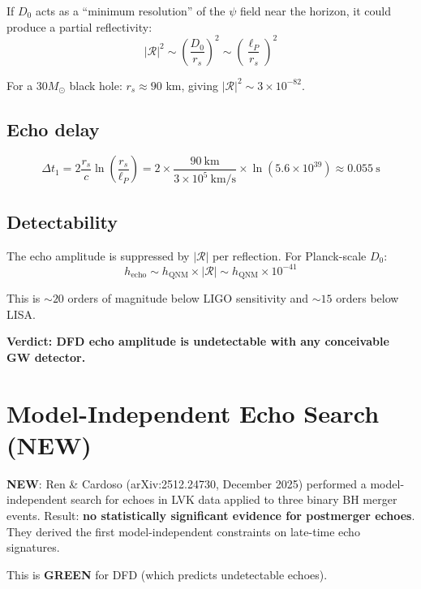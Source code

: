 \documentclass[11pt,a4paper]{article}
\newcommand{\GREEN}{\textcolor{dfdgreen}{\textbf{GREEN}}}
\newcommand{\NEW}{\textcolor{dfdblue}{\textbf{NEW}}}
\begin{document}
If $D_0$ acts as a ``minimum resolution'' of the $\psi$ field near the horizon, it could produce a partial reflectivity:
\begin{equation}
|\mathcal{R}|^2 \sim \left(\frac{D_0}{r_s}\right)^2 \sim \left(\frac{\ell_P}{r_s}\right)^2
\end{equation}

For a $30 M_\odot$ black hole: $r_s \approx 90$ km, giving $|\mathcal{R}|^2 \sim 3 \times 10^{-82}$.

\subsection{Echo delay}

\begin{equation}
\Delta t_1 = 2 \frac{r_s}{c} \ln\left(\frac{r_s}{\ell_P}\right) = 2 \times \frac{90~\text{km}}{3 \times 10^5~\text{km/s}} \times \ln(5.6 \times 10^{39}) \approx 0.055~\text{s}
\end{equation}

\subsection{Detectability}

The echo amplitude is suppressed by $|\mathcal{R}|$ per reflection. For Planck-scale $D_0$:
\begin{equation}
h_{\text{echo}} \sim h_{\text{QNM}} \times |\mathcal{R}| \sim h_{\text{QNM}} \times 10^{-41}
\end{equation}

This is $\sim 20$ orders of magnitude below LIGO sensitivity and $\sim 15$ orders below LISA.

\textbf{Verdict: DFD echo amplitude is undetectable with any conceivable GW detector.}

\section{Model-Independent Echo Search (NEW)}

\textbf{\NEW}: Ren \& Cardoso (arXiv:2512.24730, December 2025) performed a model-independent search for echoes in LVK data applied to three binary BH merger events. Result: \textbf{no statistically significant evidence for postmerger echoes}. They derived the first model-independent constraints on late-time echo signatures.

This is \GREEN{} for DFD (which predicts undetectable echoes).
\end{document}
